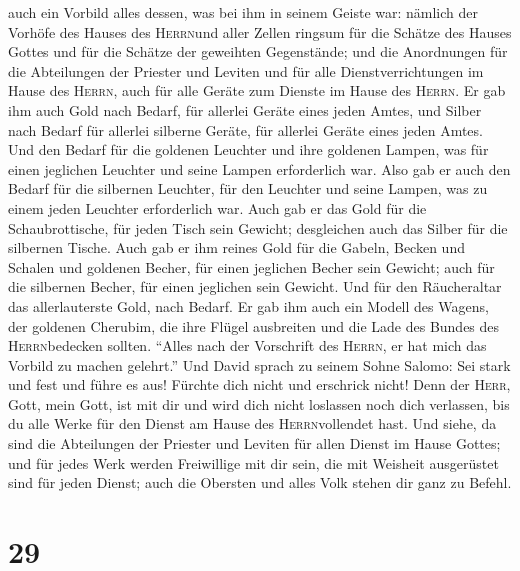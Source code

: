  auch ein Vorbild alles dessen, was bei ihm in seinem
Geiste war: nämlich der Vorhöfe des Hauses des \textsc{Herrn}und aller
Zellen ringsum für die Schätze des Hauses Gottes und für die Schätze der
geweihten Gegenstände;  und die Anordnungen für die
Abteilungen der Priester und Leviten und für alle Dienstverrichtungen im
Hause des \textsc{Herrn}, auch für alle Geräte zum Dienste im Hause des
\textsc{Herrn}.  Er gab ihm auch Gold nach Bedarf, für
allerlei Geräte eines jeden Amtes, und Silber nach Bedarf für allerlei
silberne Geräte, für allerlei Geräte eines jeden Amtes. 
Und den Bedarf für die goldenen Leuchter und ihre goldenen Lampen, was
für einen jeglichen Leuchter und seine Lampen erforderlich war. Also gab
er auch den Bedarf für die silbernen Leuchter, für den Leuchter und
seine Lampen, was zu einem jeden Leuchter erforderlich war.
 Auch gab er das Gold für die Schaubrottische, für jeden
Tisch sein Gewicht; desgleichen auch das Silber für die silbernen
Tische.  Auch gab er ihm reines Gold für die Gabeln,
Becken und Schalen und goldenen Becher, für einen jeglichen Becher sein
Gewicht; auch für die silbernen Becher, für einen jeglichen sein
Gewicht.  Und für den Räucheraltar das allerlauterste
Gold, nach Bedarf. Er gab ihm auch ein Modell des Wagens, der goldenen
Cherubim, die ihre Flügel ausbreiten und die Lade des Bundes des
\textsc{Herrn}bedecken sollten.  ``Alles nach der
Vorschrift des \textsc{Herrn}, er hat mich das Vorbild zu machen
gelehrt.''  Und David sprach zu seinem Sohne Salomo: Sei
stark und fest und führe es aus! Fürchte dich nicht und erschrick nicht!
Denn der \textsc{Herr}, Gott, mein Gott, ist mit dir und wird dich nicht
loslassen noch dich verlassen, bis du alle Werke für den Dienst am Hause
des \textsc{Herrn}vollendet hast.  Und siehe, da sind die
Abteilungen der Priester und Leviten für allen Dienst im Hause Gottes;
und für jedes Werk werden Freiwillige mit dir sein, die mit Weisheit
ausgerüstet sind für jeden Dienst; auch die Obersten und alles Volk
stehen dir ganz zu Befehl.

\hypertarget{section-28}{%
\section{29}\label{section-28}}

